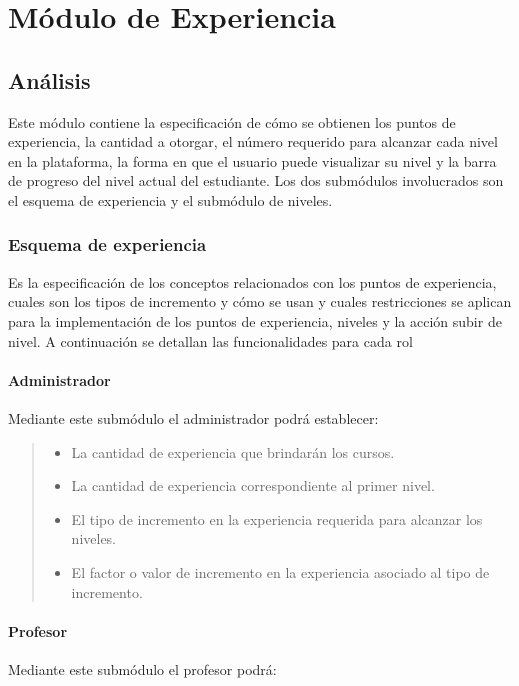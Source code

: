 \part{Módulo de Experiencia}\label{mod:exp}

\chapter{Análisis}

Este módulo contiene la especificación de cómo se obtienen los puntos de experiencia, la cantidad a otorgar, el número requerido para alcanzar cada nivel en la plataforma, la forma en que el usuario puede visualizar su nivel y la barra de progreso del nivel actual del estudiante. Los dos submódulos involucrados son el esquema de experiencia y el submódulo de niveles.

\section{Esquema de experiencia}

Es la especificación de los conceptos relacionados con los puntos de experiencia, cuales son los tipos de incremento y cómo se usan y cuales restricciones se aplican para la implementación de los puntos de experiencia, niveles y la acción subir de nivel. A continuación se detallan las funcionalidades para cada rol

\subsection*{Administrador}
 \noindent Mediante este submódulo el administrador podrá establecer:

    \begin{quote}
    \begin{itemize}
        \item La cantidad de experiencia que brindarán los cursos.
        \item La cantidad de experiencia correspondiente al primer nivel.
        \item El tipo de incremento en la experiencia requerida para alcanzar los niveles.
        \item El factor o valor de incremento en la experiencia asociado al tipo de incremento.
    \end{itemize}
    \end{quote}

\subsection*{Profesor}
\noindent Mediante este submódulo el profesor podrá:

